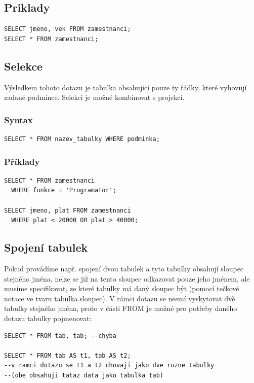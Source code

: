 \documentclass[10pt,a4paper]{article}
\begin{document}
\subsection{Priklady}
\begin{lstlisting}
SELECT jmeno, vek FROM zamestnanci;
SELECT * FROM zamestnanci;
\end{lstlisting}

\subsection{Selekce}
Výsledkem tohoto dotazu je tabulka obsahující pouze ty řádky, které vyhovují zadané podmínce. Selekci je možné kombinovat s projekcí.

\subsubsection{Syntax}
\begin{lstlisting}
SELECT * FROM nazev_tabulky WHERE podminka;
\end{lstlisting}

\subsubsection{Příklady}
\begin{lstlisting}
SELECT * FROM zamestnanci 
  WHERE funkce = 'Programator';

SELECT jmeno, plat FROM zamestnanci 
  WHERE plat < 20000 OR plat > 40000;
\end{lstlisting}

\subsection{Spojení tabulek}
Pokud provádíme např. spojení dvou tabulek a tyto tabulky obsahují sloupec stejného jména, nelze se již na tento sloupec odkazovat pouze jeho jménem, ale musíme specifikovat, ze které tabulky má daný sloupec být (pomocí tečkové notace ve tvaru tabulka.sloupec).
V rámci dotazu se nesmí vyskytovat dvě tabulky stejného jména, proto v části FROM je možné pro potřeby daného dotazu tabulky pojmenovat:
\begin{lstlisting}
SELECT * FROM tab, tab; --chyba
	
SELECT * FROM tab AS t1, tab AS t2;
--v ramci dotazu se t1 a t2 chovaji jako dve ruzne tabulky 
--(obe obsahuji tataz data jako tabulka tab)
\end{lstlisting}
\end{document}
